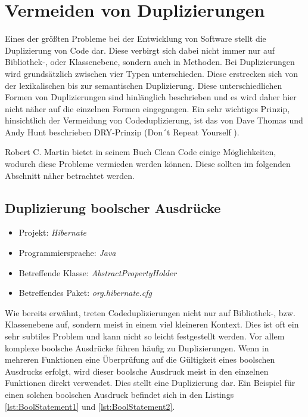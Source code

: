 \newpage
\section{Vermeiden von Duplizierungen}
Eines der größten Probleme bei der Entwicklung von Software stellt die Duplizierung von Code dar. Diese verbirgt sich dabei nicht immer nur auf Bibliothek-, oder Klassenebene, sondern auch in Methoden. Bei Duplizierungen wird grundsätzlich zwischen vier Typen unterschieden. Diese erstrecken sich von der lexikalischen bis zur semantischen Duplizierung. Diese unterschiedlichen Formen von Duplizierungen sind hinlänglich beschrieben \cite{Koschke2007} und es wird daher hier nicht näher auf die einzelnen Formen eingegangen. Ein sehr wichtiges Prinzip, hinsichtlich der Vermeidung von Codeduplizierung, ist das von Dave Thomas und Andy Hunt beschrieben DRY-Prinzip (Don´t Repeat Yourself \cite{Hunt1999}).

Robert C. Martin bietet in seinem Buch Clean Code einige Möglichkeiten, wodurch diese Probleme vermieden werden können. Diese sollten im folgenden Abschnitt näher betrachtet werden.

\subsection{Duplizierung boolscher Ausdrücke}
\label{cha:BadBoolStatements}
\begin{itemize}
	\item Projekt: \textit{Hibernate}
	\item Programmiersprache: \textit{Java}
	\item Betreffende Klasse: \textit{AbstractPropertyHolder}
	\item Betreffendes Paket: \textit{org.hibernate.cfg}
\end{itemize}

\SuperPar Wie bereits erwähnt, treten Codeduplizierungen nicht nur auf Bibliothek-, bzw. Klassenebene auf, sondern meist in einem viel kleineren Kontext. Dies ist oft ein sehr subtiles Problem und kann nicht so leicht festgestellt werden. Vor allem komplexe boolsche Ausdrücke führen häufig zu Duplizierungen. Wenn in mehreren Funktionen eine Überprüfung auf die Gültigkeit eines boolschen Ausdrucks erfolgt, wird dieser boolsche Ausdruck meist in den einzelnen Funktionen direkt verwendet. Dies stellt eine Duplizierung dar. Ein Beispiel für einen solchen boolschen Ausdruck befindet sich in den Listings \ref{lst:BoolStatement1} und  \ref{lst:BoolStatement2}.

